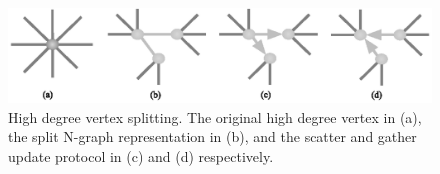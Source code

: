 \documentclass[12pt]{article}
\begin{document}
\begin{figure}
  \includegraphics[width=\textwidth]{vtxSplitting.eps}
  \caption{\label{fig:vtxSplitting}
    High degree vertex splitting. 
    The original high degree vertex in (a), the split N-graph representation in
    (b), and the scatter and gather update protocol in (c) and (d) respectively.
  }
\end{figure}



\end{document}
